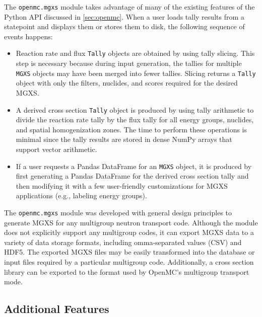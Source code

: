 The \texttt{openmc.mgxs} module takes advantage of many of the existing features of the Python API discussed in \cref{sec:openmc}. When a user loads tally results from a statepoint and displays them or stores them to disk, the following sequence of events happens:

\begin{itemize}[noitemsep]
\item Reaction rate and flux \texttt{Tally} objects are obtained by using tally slicing. This step is necessary because during input generation, the tallies for multiple \texttt{MGXS} objects may have been merged into fewer tallies. Slicing returns a \texttt{Tally} object with only the filters, nuclides, and scores required for the desired MGXS.
\item A derived cross section \texttt{Tally} object is produced by using tally arithmetic to divide the reaction rate tally by the flux tally for all energy groups, nuclides, and spatial homogenization zones. The time to perform these operations is minimal since the tally results are stored in dense NumPy arrays that support vector arithmetic.
\item If a user requests a Pandas DataFrame for an \texttt{MGXS} object, it is produced by first generating a Pandas DataFrame for the derived cross section tally and then modifying it with a few user-friendly customizations for MGXS applications (\textrm{e.g.}, labeling energy groups).
\end{itemize}

The \texttt{openmc.mgxs} module was developed with general design principles to generate MGXS for any multigroup neutron transport code. Although the module does not explicitly support any multigroup codes, it can export MGXS data to a variety of data storage formats, including omma-separated values (CSV) and HDF5. The exported MGXS files may be easily transformed into the database or input files required by a particular multigroup code. Additionally, a cross section library can be exported to the format used by OpenMC's multigroup transport mode.

\subsection{Additional Features}
\label{sec:features}


